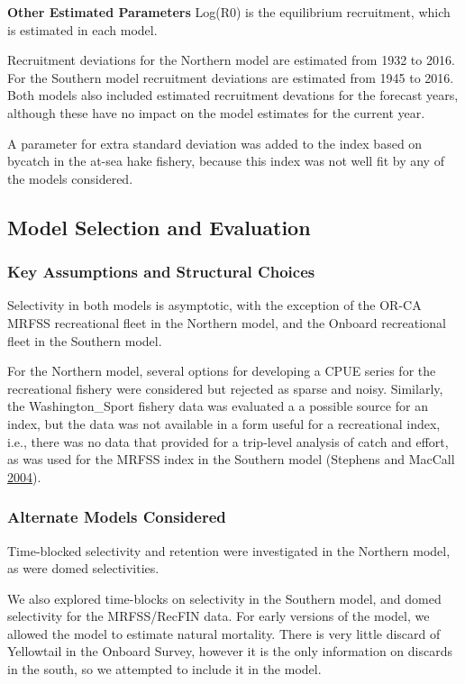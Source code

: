\documentclass[12pt,]{article}
\begin{document}
\textbf{Other Estimated Parameters} Log(R0) is the equilibrium
recruitment, which is estimated in each model.

Recruitment deviations for the Northern model are estimated from 1932 to
2016. For the Southern model recruitment deviations are estimated from
1945 to 2016. Both models also included estimated recruitment devations
for the forecast years, although these have no impact on the model
estimates for the current year.

A parameter for extra standard deviation was added to the index based on
bycatch in the at-sea hake fishery, because this index was not well fit
by any of the models considered.

\clearpage

\subsection{Model Selection and
Evaluation}\label{model-selection-and-evaluation}

\subsubsection{Key Assumptions and Structural
Choices}\label{key-assumptions-and-structural-choices}

Selectivity in both models is asymptotic, with the exception of the
OR-CA MRFSS recreational fleet in the Northern model, and the Onboard
recreational fleet in the Southern model.

For the Northern model, several options for developing a CPUE series for
the recreational fishery were considered but rejected as sparse and
noisy. Similarly, the Washington\_Sport fishery data was evaluated a a
possible source for an index, but the data was not available in a form
useful for a recreational index, i.e., there was no data that provided
for a trip-level analysis of catch and effort, as was used for the MRFSS
index in the Southern model (Stephens and MacCall
\protect\hyperlink{ref-Stephens2004}{2004}).

\subsubsection{Alternate Models
Considered}\label{alternate-models-considered}

Time-blocked selectivity and retention were investigated in the Northern
model, as were domed selectivities.

We also explored time-blocks on selectivity in the Southern model, and
domed selectivity for the MRFSS/RecFIN data. For early versions of the
model, we allowed the model to estimate natural mortality. There is very
little discard of Yellowtail in the Onboard Survey, however it is the
only information on discards in the south, so we attempted to include it
in the model.
\end{document}
